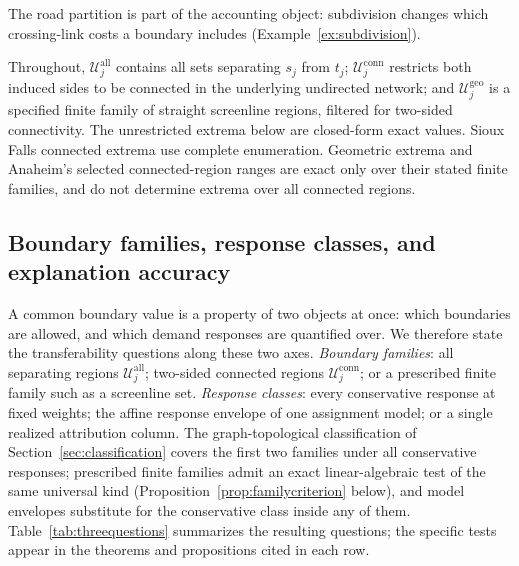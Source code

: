\documentclass[a4paper,fleqn]{cas-sc}
\begin{document}
The road partition is part of the accounting object: subdivision changes
which crossing-link costs a boundary includes (Example~\ref{ex:subdivision}).

Throughout, $\mathcal U_j^{\mathrm{all}}$ contains all sets separating
$s_j$ from $t_j$; $\mathcal U_j^{\mathrm{conn}}$ restricts both induced sides
to be connected in the underlying undirected network; and
$\mathcal U_j^{\mathrm{geo}}$ is a specified finite family of straight
screenline regions, filtered for two-sided connectivity.
The unrestricted extrema below are closed-form exact values. Sioux Falls
connected extrema use complete enumeration. Geometric extrema and Anaheim's
selected connected-region ranges are exact only over their stated finite
families, and do not determine extrema over all connected regions.

\subsection{Boundary families, response classes, and explanation accuracy}\label{sec:levels}\label{sec:hierarchy}
A common boundary value is a property of two objects at once: which
boundaries are allowed, and which demand responses are quantified over.
We therefore state the transferability questions along these two axes.
\emph{Boundary families}: all separating regions
$\mathcal U_j^{\mathrm{all}}$; two-sided connected regions
$\mathcal U_j^{\mathrm{conn}}$; or a prescribed finite family such as a
screenline set. \emph{Response classes}: every conservative response at
fixed weights; the affine response envelope of one assignment model;
or a single realized attribution column. The graph-topological
classification of Section~\ref{sec:classification} covers the first two
families under all conservative responses; prescribed finite families
admit an exact linear-algebraic test of the same universal kind
(Proposition~\ref{prop:familycriterion} below), and model envelopes
substitute for the conservative class inside any of them.
Table~\ref{tab:threequestions} summarizes the resulting questions; the
specific tests appear in the theorems and propositions cited in each
row.
\end{document}
